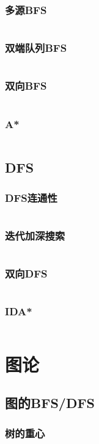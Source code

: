 \documentclass[a4paper,12pt]{article}
\begin{document}
\subsubsection{多源BFS}
\inputminted[breaklines]{c++}{search/bfs/mul_source.cc}
\subsubsection{双端队列BFS}
\inputminted[breaklines]{c++}{search/bfs/deq_bfs.cc}
\subsubsection{双向BFS}
\inputminted[breaklines]{c++}{search/bfs/2side_bfs.cc}
\subsubsection{A*}
\inputminted[breaklines]{c++}{search/bfs/astar.cc}
\subsection{DFS}
\subsubsection{DFS连通性}
\inputminted[breaklines]{c++}{search/dfs/link.cc}
\subsubsection{迭代加深搜索}
\inputminted[breaklines]{c++}{search/dfs/diedai.cc}
\subsubsection{双向DFS}
\inputminted[breaklines]{c++}{search/dfs/2side.cc}
\subsubsection{IDA*}
\inputminted[breaklines]{c++}{search/dfs/ida.cc}


\newpage
\section{图论} %
\subsection{图的BFS/DFS}  %
\subsubsection{树的重心}
\inputminted[breaklines]{c++}{graph/bdfs/grav.cc}
\end{document}
